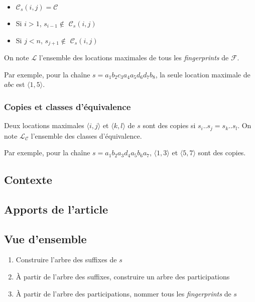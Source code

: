 \documentclass[a4paper]{article}
\begin{document}
\begin{itemize}
	\item $\mathcal{C}_{s}(i,j) = \mathcal{C}$
	\item Si $i > 1$, $s_{i-1} \notin$ $\mathcal{C}_{s}(i,j)$
	\item Si $j < n$, $s_{j+1} \notin$ $\mathcal{C}_{s}(i,j)$
\end{itemize}

On note $\mathcal{L}$ l'ensemble des locations maximales de tous les \textit{fingerprints} de $\mathcal{F}$. \newline

Par exemple, pour la chaîne $s = a_{1} b_{2} c_{3} a_{4} a_{5} d_{6} d_{7} b_{8}$, la seule location maximale de $abc$ est $\langle1,5\rangle$.

\subsubsection{Copies et classes d'équivalence}

Deux locations maximales $\langle i,j \rangle$ et $\langle k,l \rangle$ de $s$ sont des copies si $s_{i}..s_{j} = s_{k}..s_{l}$. On note $\mathcal{L}_{\mathcal{C}}$ l'ensemble des classes d'équivalence. \newline

Par exemple, pour la chaîne $s = a_{1} b_{2} a_{3} d_{4} a_{5} b_{6} a_{7}$, $\langle1,3\rangle$ et $\langle5,7\rangle$ sont des copies.

\subsection{Contexte}

\subsection{Apports de l'article}

\subsection{Vue d'ensemble}
	
\begin{enumerate}
	\item Construire l'arbre des suffixes de $s$
	\item À partir de l'arbre des suffixes, construire un arbre des participations
	\item À partir de l'arbre des participations, nommer tous les \textit{fingerprints} de $s$
\end{enumerate}
\end{document}
